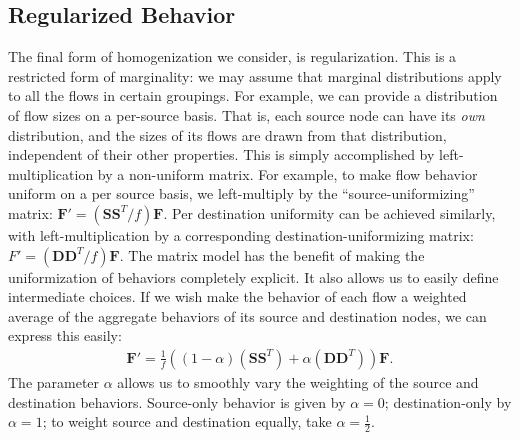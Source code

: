\documentclass[twocolumn,final]{svjour3}
\newcommand{\mat}[1]{\mathbf{#1}}
\newcommand{\trans}[1]{{#1}^T}
\begin{document}
\subsection{Regularized Behavior}

The final form of homogenization we consider, is regularization. This is a restricted form of marginality: we may assume that marginal distributions apply to all the flows in certain groupings. For example, we can provide a distribution of flow sizes on a per-source basis. That is, each source node can have its \textit{own} distribution, and the sizes of its flows are drawn from that distribution, independent of their other properties. This is simply accomplished by left-multiplication by a non-uniform matrix. For example, to make flow behavior uniform on a per source basis, we left-multiply by the ``source-uniformizing'' matrix: $\mat{F}'=(\trans{\mat{SS}}/f)\mat{F}$. Per destination uniformity can be achieved similarly, with left-multiplication by a corresponding destination-uniformizing matrix: $F'=(\trans{\mat{DD}}/f)\mat{F}$.
The matrix model has the benefit of making the uniformization of behaviors completely explicit. It also allows us to easily define intermediate choices. If we wish make the behavior of each flow a weighted average of the aggregate behaviors of its source and destination nodes, we can express this easily:
\begin{align}
\mat{F}' = \frac{1}{f}((1-\alpha)(\trans{\mat{SS}})+\alpha(\trans{\mat{DD}}))\mat{F}.
\end{align}
The parameter $\alpha$ allows us to smoothly vary the weighting of the source and destination behaviors. Source-only behavior is given by $\alpha=0$; destination-only by $\alpha=1$; to weight source and destination equally, take $\alpha=\frac{1}{2}$.

\end{document}

